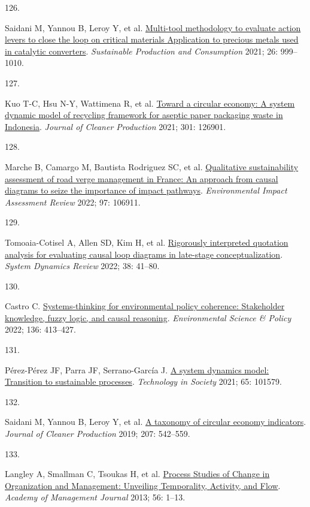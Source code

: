 \documentclass[
  11pt,
  a4paperpaper,
  onecolumn]{article}
\newlength{\cslhangindent}
\newlength{\csllabelwidth}
\newlength{\cslentryspacingunit} %
\newenvironment{CSLReferences}[2] %
 {%
  \setlength{\parindent}{0pt}
  \ifodd #1
  \let\oldpar\par
  \def\par{\hangindent=\cslhangindent\oldpar}
  \fi
  \setlength{\parskip}{#2\cslentryspacingunit}
 }%
 {}
\newcommand{\CSLLeftMargin}[1]{\parbox[t]{\csllabelwidth}{#1}}
\newcommand{\CSLRightInline}[1]{\parbox[t]{\linewidth - \csllabelwidth}{#1}\break}
\begin{document}
\begin{CSLReferences}{0}{0}
\leavevmode{}%
\CSLLeftMargin{126. }%
\CSLRightInline{Saidani M, Yannou B, Leroy Y, et al.
\href{https://doi.org/10.1016/j.spc.2021.01.010}{Multi-tool methodology
to evaluate action levers to close the loop on critical materials
\textendash{} {Application} to precious metals used in catalytic
converters}. \emph{Sustainable Production and Consumption} 2021; 26:
999--1010.}

\leavevmode{}%
\CSLLeftMargin{127. }%
\CSLRightInline{Kuo T-C, Hsu N-Y, Wattimena R, et al.
\href{https://doi.org/10.1016/j.jclepro.2021.126901}{Toward a circular
economy: {A} system dynamic model of recycling framework for aseptic
paper packaging waste in {Indonesia}}. \emph{Journal of Cleaner
Production} 2021; 301: 126901.}

\leavevmode{}%
\CSLLeftMargin{128. }%
\CSLRightInline{Marche B, Camargo M, Bautista Rodriguez SC, et al.
\href{https://doi.org/10.1016/j.eiar.2022.106911}{Qualitative
sustainability assessment of road verge management in {France}: {An}
approach from causal diagrams to seize the importance of impact
pathways}. \emph{Environmental Impact Assessment Review} 2022; 97:
106911.}

\leavevmode{}%
\CSLLeftMargin{129. }%
\CSLRightInline{Tomoaia-Cotisel A, Allen SD, Kim H, et al.
\href{https://doi.org/10.1002/SDR.1701}{Rigorously interpreted quotation
analysis for evaluating causal loop diagrams in late-stage
conceptualization}. \emph{System Dynamics Review} 2022; 38: 41--80.}

\leavevmode{}%
\CSLLeftMargin{130. }%
\CSLRightInline{Castro C.
\href{https://doi.org/10.1016/j.envsci.2022.07.001}{Systems-thinking for
environmental policy coherence: {Stakeholder} knowledge, fuzzy logic,
and causal reasoning}. \emph{Environmental Science \& Policy} 2022; 136:
413--427.}

\leavevmode{}%
\CSLLeftMargin{131. }%
\CSLRightInline{Pérez-Pérez JF, Parra JF, Serrano-García J.
\href{https://doi.org/10.1016/j.techsoc.2021.101579}{A system dynamics
model: {Transition} to sustainable processes}. \emph{Technology in
Society} 2021; 65: 101579.}

\leavevmode{}%
\CSLLeftMargin{132. }%
\CSLRightInline{Saidani M, Yannou B, Leroy Y, et al.
\href{https://doi.org/10.1016/j.jclepro.2018.10.014}{A taxonomy of
circular economy indicators}. \emph{Journal of Cleaner Production} 2019;
207: 542--559.}

\leavevmode{}%
\CSLLeftMargin{133. }%
\CSLRightInline{Langley A, Smallman C, Tsoukas H, et al.
\href{https://doi.org/10.5465/amj.2013.4001}{Process {Studies} of
{Change} in {Organization} and {Management}: {Unveiling Temporality},
{Activity}, and {Flow}}. \emph{Academy of Management Journal} 2013; 56:
1--13.}

\end{CSLReferences}
\end{document}
